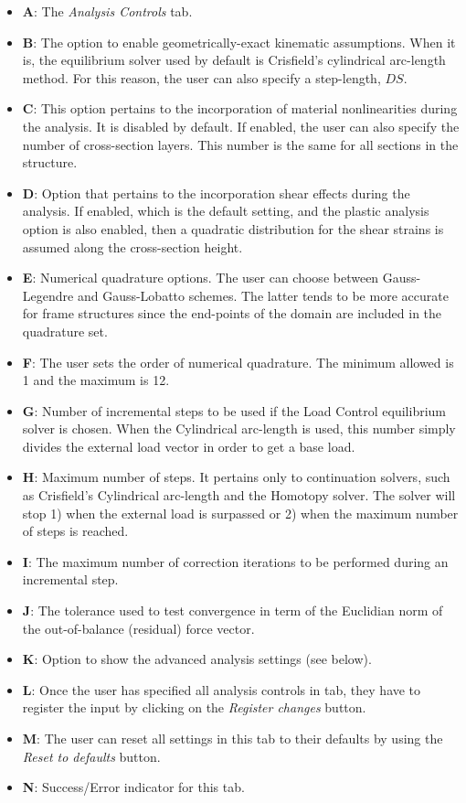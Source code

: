 \begin{itemize}
	\item \textbf{A}: The \textit{Analysis Controls} tab.
	\item \textbf{B}: The option to enable geometrically-exact kinematic 
	assumptions. When it is, the equilibrium solver used by default is 
	Crisfield's cylindrical arc-length method. For this reason, the user can 
	also specify a step-length, $DS$. 
	\item \textbf{C}: This option pertains to the incorporation of material 
	nonlinearities during the analysis. It is disabled by default. If enabled, 
	the user can also specify the number of cross-section layers. This number 
	is the same for all sections in the structure.
	\item \textbf{D}: Option that pertains to the incorporation shear effects 
	during the analysis. If enabled, which is the default setting, and the 
	plastic analysis option is also enabled, then a quadratic distribution for 
	the shear strains is assumed along the cross-section height.
	\item \textbf{E}: Numerical quadrature options. The user can choose between 
	Gauss-Legendre and Gauss-Lobatto schemes. The latter tends to be more 
	accurate for frame structures since the end-points of the domain are 
	included in the quadrature set.
	\item \textbf{F}: The user sets the order of numerical quadrature. The 
	minimum allowed is 1 and the maximum is 12.
	\item \textbf{G}: Number of incremental steps to be used if the Load 
	Control equilibrium solver is chosen. When the Cylindrical arc-length is 
	used, this number simply divides the external load vector in order to get a 
	base load.
	\item \textbf{H}: Maximum number of steps. It pertains only to continuation 
	solvers, such as Crisfield's Cylindrical arc-length and the Homotopy 
	solver. The solver will stop 1) when the external load is surpassed or 2) 
	when the maximum number of steps is reached.
	\item \textbf{I}: The maximum number of correction iterations to be 
	performed during an incremental step.
	\item \textbf{J}: The tolerance used to test convergence in term of the 
	Euclidian norm of the out-of-balance (residual) force vector.
	\item \textbf{K}: Option to show the advanced analysis settings (see below).
	\item \textbf{L}: Once the user has specified all analysis controls in tab, 
	they have to register the input by clicking on the \textit{Register 
	changes} button.
	\item \textbf{M}: The user can reset all settings in this tab to their 
	defaults by using the \textit{Reset to defaults} button.
	\item \textbf{N}: Success/Error indicator for this tab.
\end{itemize}

